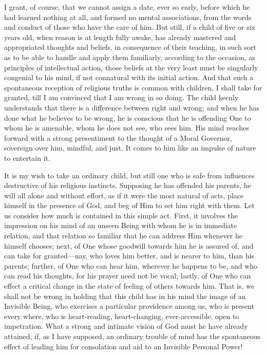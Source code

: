 I grant, of course, that we cannot assign a date, ever so early,
before which he had learned nothing at all, and formed no mental
associations, from the words and conduct of those who have the care of
him. But still, if a child of five or six years old, when reason is at
length fully awake, has already mastered and appropriated thoughts and
beliefs, in consequence of their teaching, in such sort as to be able
to handle and apply them familiarly, according to the occasion, as
principles of intellectual action, those beliefs at the very least
must be singularly congenial to his mind, if not connatural with its
initial action. And that such a spontaneous reception of religious
truths is common with children, I shall take for granted, till I am
convinced that I am wrong in so doing. The child keenly understands
that there is a difference between right and wrong; and when he has
done what he believes to be wrong, he is conscious that he is
offending One to whom he is amenable, whom he does not see, who sees
him. His mind reaches forward with a strong presentiment to the
thought of a Moral Governor, sovereign over him, mindful, and just. It
comes to him like an impulse of nature to entertain it.

It is my wish to take an ordinary child, but still one who is safe
from influences destructive of his religious instincts. Supposing he
has offended his parents, he will all alone and without effort, as if
it were the most natural of acts, place himself in the presence
of God, and beg of Him to set him right with them. Let us consider how
much is contained in this simple act. First, it involves the
impression on his mind of an unseen Being with whom he is in immediate
relation, and that relation so familiar that he can address Him
whenever he himself chooses; next, of One whose goodwill towards him
he is assured of, and can take for granted—nay, who loves him
better, and is nearer to him, than his parents; further, of One who
can hear him, wherever he happens to be, and who can read his
thoughts, for his prayer need not be vocal; lastly, of One who can
effect a critical change in the state of feeling of others towards
him. That is, we shall not be wrong in holding that this child has in
his mind the image of an Invisible Being, who exercises a particular
providence among us, who is present every where, who is heart-reading,
heart-changing, ever-accessible, open to impetration. What a strong
and intimate vision of God must he have already attained, if, as I
have supposed, an ordinary trouble of mind has the spontaneous effect
of leading him for consolation and aid to an Invisible Personal Power!

